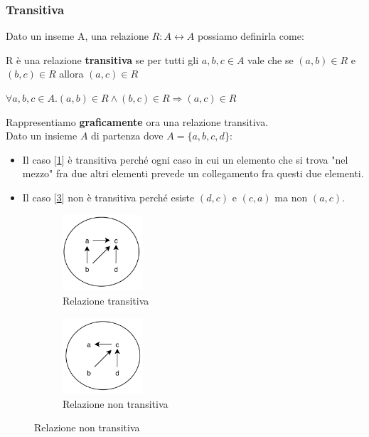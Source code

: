 \subsubsection{Transitiva}
Dato un inseme A, una relazione $R: A \leftrightarrow A$ possiamo definirla come:
\begin{definition}[Transitiva]
    R è una relazione \textbf{transitiva} se per tutti gli $a,b,c \in A$ vale che se $(a, b) \in R$ e $(b, c) \in R$ allora $(a, c) \in R$
    \begin{center}
        $\forall a,b,c \in A . (a, b) \in R \land (b, c) \in R \Rightarrow (a,c) \in R$
    \end{center}
\end{definition}
Rappresentiamo \textbf{graficamente} ora una relazione transitiva. \\Dato un insieme $A$ di partenza dove $A = \{a, b, c, d\}$:
\begin{itemize}
    \item Il caso [\ref{fig:relazione-transitiva}] è transitiva perché ogni caso in cui un elemento che si trova "nel mezzo" fra due altri elementi prevede un collegamento fra questi due elementi.
    \item Il caso [\ref{fig:relazione-non-transitiva}] non è transitiva perché esiste $(d,c)$ e $(c,a)$ ma non $(a,c)$.
\end{itemize}
\begin{figure}[h!]
    \vspace{-10pt}
    \centering
    \begin{subfigure}{.3\textwidth}
        \centering
        \includegraphics[width=3cm]{images/relazione-transitiva.png}
        \caption{Relazione transitiva}
        \label{fig:relazione-transitiva}
    \end{subfigure}
    \hspace{1.5cm}
    \begin{subfigure}{.3\textwidth}
        \centering
        \includegraphics[width=3cm]{images/relazione-non-transitiva.png}
        \caption{Relazione non transitiva}
        \label{fig:relazione-non-transitiva}
    \end{subfigure}
\end{figure}
